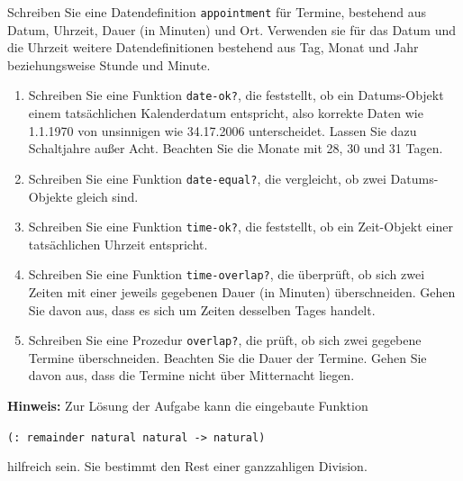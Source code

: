 \begin{aufgabe}

  Schreiben Sie eine Datendefinition
  \texttt{appointment} für Termine, bestehend aus Datum, Uhrzeit,
  Dauer (in Minuten) und Ort.  Verwenden sie für das Datum und die
  Uhrzeit weitere Datendefinitionen bestehend aus Tag, Monat und Jahr
  beziehungsweise Stunde und Minute.

  \begin{enumerate}
  \item Schreiben Sie eine Funktion \texttt{date-ok?}, die feststellt,
    ob ein Datums-Objekt einem tatsächlichen Kalenderdatum entspricht,
    also korrekte Daten wie 1.1.1970 von unsinnigen wie 34.17.2006
    unterscheidet. Lassen Sie dazu Schaltjahre außer Acht. Beachten
    Sie die Monate mit 28, 30 und 31 Tagen.
  \item Schreiben Sie eine Funktion \texttt{date-equal?}, die
    vergleicht, ob zwei Datums-Objekte gleich sind.
  \item Schreiben Sie eine Funktion \texttt{time-ok?}, die feststellt,
    ob ein Zeit-Objekt einer tatsächlichen Uhrzeit entspricht.
  \item Schreiben Sie eine Funktion \texttt{time-overlap?}, die
    überprüft, ob sich zwei Zeiten mit einer jeweils gegebenen Dauer
    (in Minuten) überschneiden. Gehen Sie davon aus, dass es sich um
    Zeiten desselben Tages handelt.
  \item Schreiben Sie eine Prozedur \texttt{overlap?}, die prüft, ob
    sich zwei gegebene Termine überschneiden. Beachten Sie die Dauer
    der Termine. Gehen Sie davon aus, dass die Termine nicht über
    Mitternacht liegen.
  \end{enumerate}
  \textbf{Hinweis:} Zur Lösung der Aufgabe kann die eingebaute
  Funktion
  \begin{center}
    \texttt{(: remainder natural natural -> natural)}
  \end{center}

  hilfreich sein. Sie bestimmt den Rest einer ganzzahligen Division.

\end{aufgabe}

